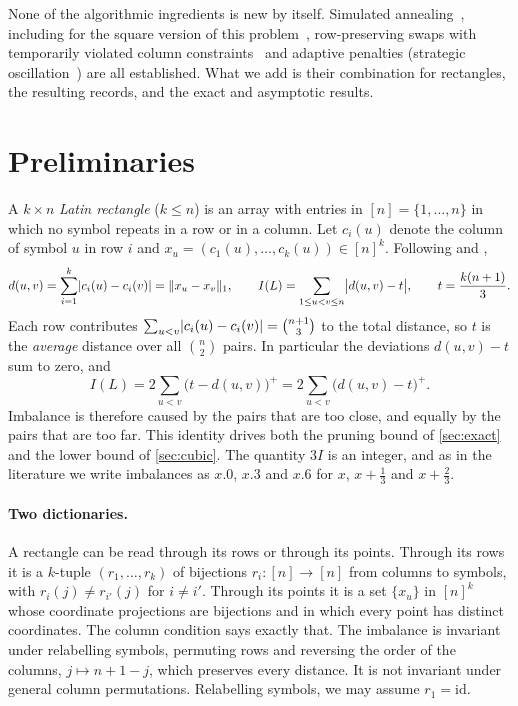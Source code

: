 \documentclass[11pt]{article}
\theoremstyle{plain}
\theoremstyle{definition}
\theoremstyle{remark}
\DeclarePairedDelimiter{\abs}{\lvert}{\rvert}
\begin{document}
None of the algorithmic ingredients is new by itself. Simulated
annealing~\citep{KirkpatrickGelattVecchi1983}, including for the square version of this
problem~\citep{XiaEtAl2026}, row-preserving swaps with temporarily
violated column constraints~\citep{ZhangMa2008,XieEtAl2024} and adaptive penalties
(strategic oscillation~\citep{GloverHao2011}) are all established. What we add is their
combination for rectangles, the resulting records, and the exact and asymptotic results.

\section{Preliminaries}\label{sec:prelim}

A $k\times n$ \emph{Latin rectangle} ($k\le n$) is an array with entries in
$[n]=\{1,\dots,n\}$ in which no symbol repeats in a row or in a column. Let $c_i(u)$ denote the
column of symbol $u$ in row $i$ and $x_u=(c_1(u),\dots,c_k(u))\in[n]^k$. Following
\citet{DiazLeBrasGomes2017} and \citet{RamaswamySzeider2023},
\[
  d(u,v)=\sum_{i=1}^k\abs{c_i(u)-c_i(v)}=\lVert x_u-x_v\rVert_1,
  \qquad
  I(L)=\sum_{1\le u<v\le n}\abs[\big]{d(u,v)-t},
  \qquad t=\frac{k(n+1)}{3}.
\]
Each row contributes $\sum_{u<v}\abs{c_i(u)-c_i(v)}=\binom{n+1}{3}$ to the total distance, so
$t$ is the \emph{average} distance over all $\binom n2$ pairs. In particular the deviations
$d(u,v)-t$ sum to zero, and
\begin{equation}\label{eq:half}
  I(L)=2\sum_{u<v}\bigl(t-d(u,v)\bigr)^+=2\sum_{u<v}\bigl(d(u,v)-t\bigr)^+ .
\end{equation}
Imbalance is therefore caused by the pairs that are too close, and equally by the pairs that are
too far. This identity drives both the pruning bound of \cref{sec:exact} and the lower bound of
\cref{sec:cubic}. The quantity $3I$ is an integer, and as in the literature we write
imbalances as $x.0$, $x.3$ and $x.6$ for $x$, $x+\frac13$ and $x+\frac23$.

\paragraph{Two dictionaries.} A rectangle can be read through its rows or through its points.
Through its rows it is a $k$-tuple $(r_1,\dots,r_k)$ of bijections $r_i\colon[n]\to[n]$ from
columns to symbols, with $r_i(j)\ne r_{i'}(j)$ for $i\ne i'$. Through its points it is a set
$\{x_u\}$ in $[n]^k$ whose coordinate projections are bijections and in which every point has
distinct coordinates. The column condition says exactly that.
The imbalance is invariant under relabelling symbols, permuting rows and reversing the order of
the columns, $j\mapsto n+1-j$, which preserves every distance. It is not invariant under general
column permutations. Relabelling symbols, we may assume $r_1=\mathrm{id}$.
\end{document}
